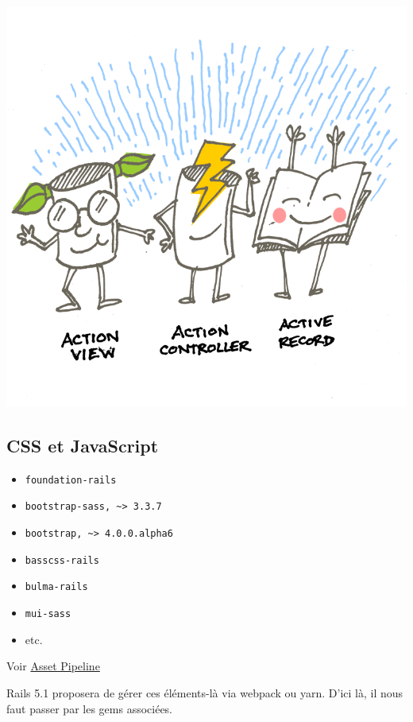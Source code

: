 \includegraphics{src/img/action-pack.png}

\hypertarget{css-et-javascript}{%
\subsection{CSS et JavaScript}\label{css-et-javascript}}

\begin{itemize}
\tightlist
\item
  \textenglish{\texttt{foundation-rails}}
\item
  \textenglish{\texttt{bootstrap-sass,\ \textasciitilde{}\textgreater{}\ 3.3.7}}
\item
  \textenglish{\texttt{bootstrap,\ \textasciitilde{}\textgreater{}\ 4.0.0.alpha6}}
\item
  \textenglish{\texttt{basscss-rails}}
\item
  \textenglish{\texttt{bulma-rails}}
\item
  \textenglish{\texttt{mui-sass}}
\item
  etc.
\end{itemize}

Voir \href{http://guides.rubyonrails.org/asset_pipeline.html}{Asset
Pipeline}

Rails 5.1 proposera de gérer ces éléments-là via webpack ou yarn. D'ici
là, il nous faut passer par les gems associées.

